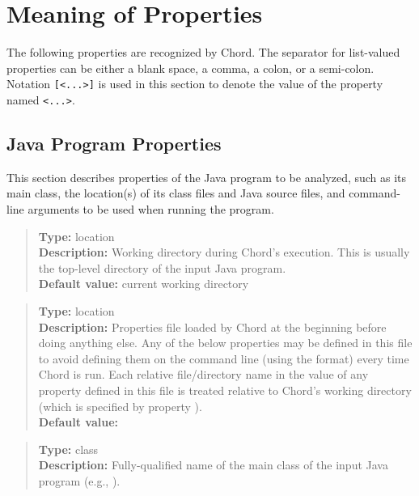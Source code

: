 \section{Meaning of Properties}
\label{sec:properties-meaning}

The following properties are recognized by Chord.
The separator for list-valued properties can be either a blank space, a comma, a colon, or a semi-colon.
Notation {\tt [<...>]} is used in this section to denote the value of the property named {\tt <...>}.

\subsection{Java Program Properties} 
\label{sec:program-props}

This section describes properties of the Java program to be analyzed, such as
its main class, the location(s) of its class files and Java source
files, and command-line arguments to be used when running the program.

\begin{quote}
{\bf Type:} location \\
{\bf Description:} Working directory during Chord's execution.  This is
usually the top-level directory of the input Java program. \\
{\bf Default value:} current working directory
\end{quote}

\begin{quote}
{\bf Type:} location \\
{\bf Description:} Properties file loaded by Chord at the
beginning before doing anything else.  Any of the below properties may
be defined in this file to avoid defining them on the command line
(using the  format) every time Chord is run.
Each relative file/directory name in the value of any property defined
in this file is treated relative to Chord's working directory (which
is specified by property ). \\
{\bf Default value:} 
\end{quote}

\begin{quote}
{\bf Type:} class \\
{\bf Description:} Fully-qualified name of the main class of the input Java program (e.g., ).
\end{quote}

